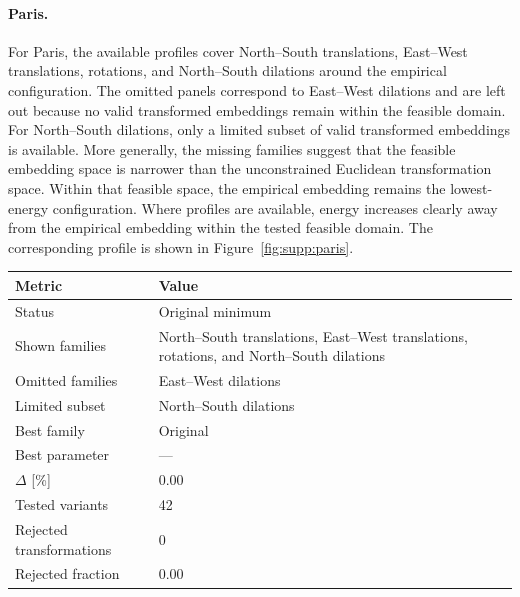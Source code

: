\documentclass{article}
\begin{document}
\paragraph*{Paris.} For Paris, the available profiles cover North--South translations, East--West translations, rotations, and North--South dilations around the empirical configuration. The omitted panels correspond to East--West dilations and are left out because no valid transformed embeddings remain within the feasible domain. For North--South dilations, only a limited subset of valid transformed embeddings is available. More generally, the missing families suggest that the feasible embedding space is narrower than the unconstrained Euclidean transformation space. Within that feasible space, the empirical embedding remains the lowest-energy configuration. Where profiles are available, energy increases clearly away from the empirical embedding within the tested feasible domain. The corresponding profile is shown in Figure~\ref{fig:supp:paris}.


\begin{center}
\begin{tabular}{p{}p{}}
\toprule
Metric & Value \\
\midrule
Status & Original minimum \\
Shown families & North--South translations, East--West translations, rotations, and North--South dilations \\
Omitted families & East--West dilations \\
Limited subset & North--South dilations \\
Best family & Original \\
Best parameter & --- \\
$\Delta$ [\%] & 0.00 \\
Tested variants & 42 \\
Rejected transformations & 0 \\
Rejected fraction & 0.00 \\
\bottomrule
\end{tabular}
\end{center}
\end{document}
